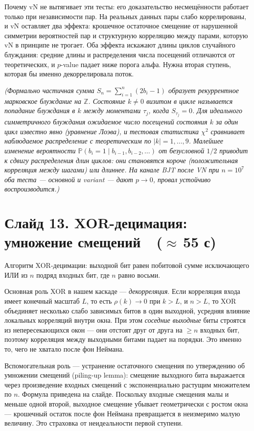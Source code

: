\documentclass[12pt,a4paper]{extarticle}
\newcommand{\note}[1]{%
  \par
  {\small\color{noteclr}\itshape (#1)}%
  \par}
\begin{document}
Почему vN не вытягивает эти тесты: его доказательство несмещённости работает
только при независимости пар. На реальных данных пары слабо коррелированы,
и vN оставляет два эффекта: крошечное остаточное смещение от нарушенной
симметрии вероятностей пар и структурную корреляцию между парами, которую vN
в принципе не трогает. Оба эффекта искажают длины циклов случайного блуждания:
средние длины и распределения числа посещений отличаются от теоретических,
и $p$-value падает ниже порога альфа. Нужна вторая ступень, которая бы
именно декоррелировала поток.

\note{Формально частичная сумма $S_n=\sum_{i=1}^n(2b_i-1)$ образует
рекуррентное марковское блуждание на $\mathbb{Z}$. Состояние $k\neq 0$
визитом в цикле называется попадание блуждания в $k$ между моментами
$\tau_j$, когда $S_{\tau_j}=0$. Для идеального симметричного блуждания
ожидаемое число посещений состояния $k$ за один цикл известно явно
(уравнение Лоэва), и тестовая статистика $\chi^2$ сравнивает наблюдаемое
распределение с теоретическим по $|k|=1,\ldots,9$. Малейшее изменение
вероятности $\mathbb{P}(b_i=1\mid b_{i-1},b_{i-2},\ldots)$ от безусловной
$1/2$ приводит к сдвигу распределения длин циклов: они становятся короче
(положительная корреляция между шагами) или длиннее. На канале BJT после
VN при $n=10^7$ оба теста --- основной и variant --- дают $p\to 0$, провал
устойчиво воспроизводится.}

\section*{Слайд 13. XOR-децимация: умножение смещений~~($\approx$\,55 с)}

Алгоритм XOR-децимации: выходной бит равен побитовой сумме исключающего ИЛИ
из $n$ подряд входных бит, где $n$ равно восьми.

Основная роль XOR в нашем каскаде --- \emph{декорреляция}. Если корреляция
входа имеет конечный масштаб $L$, то есть $\rho(k)\to 0$ при $k>L$, и
$n > L$, то XOR объединяет несколько слабо зависимых битов в один выходной,
усредняя влияние локальных корреляций внутри окна. При этом \emph{соседние
выходные} биты строятся из непересекающихся окон --- они отстоят друг от
друга на $\ge n$ входных бит, поэтому корреляция между выходными битами
падает на порядки. Это именно то, чего не хватало после фон Неймана.

Вспомогательная роль --- устранение остаточного смещения по утверждению
об умножении смещений (piling-up lemma): смещение выходного бита
выражается через произведение входных смещений с экспоненциально растущим
множителем по $n$. Формула приведена на слайде. Поскольку входные смещения
малы и меньше одной второй, выходное смещение убывает геометрически с
ростом окна --- крошечный остаток после фон Неймана превращается в
неизмеримо малую величину. Это страховка от неидеальности первой ступени.
\end{document}
